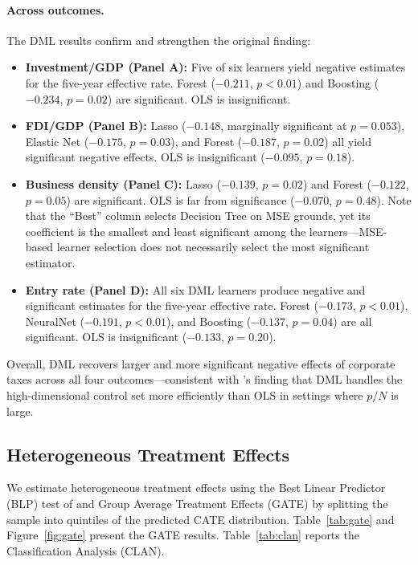 \documentclass[12pt]{article}
\begin{document}
\paragraph{Across outcomes.}
The DML results confirm and strengthen the original finding:
\begin{itemize}
  \item \textbf{Investment/GDP (Panel A):} Five of six learners yield negative estimates
        for the five-year effective rate. Forest ($-0.211$, $p < 0.01$) and Boosting
        ($-0.234$, $p = 0.02$) are significant. OLS is insignificant.
  \item \textbf{FDI/GDP (Panel B):} Lasso ($-0.148$, marginally significant at $p = 0.053$), Elastic Net
        ($-0.175$, $p = 0.03$), and Forest ($-0.187$, $p = 0.02$) all yield significant
        negative effects. OLS is insignificant ($-0.095$, $p = 0.18$).
  \item \textbf{Business density (Panel C):} Lasso ($-0.139$, $p = 0.02$) and Forest
        ($-0.122$, $p = 0.05$) are significant. OLS is far from significance
        ($-0.070$, $p = 0.48$). Note that the ``Best'' column selects Decision Tree
        on MSE grounds, yet its coefficient is the smallest and least significant
        among the learners---MSE-based learner selection does not necessarily select
        the most significant estimator.
  \item \textbf{Entry rate (Panel D):} All six DML learners produce negative and
        significant estimates for the five-year effective rate. Forest ($-0.173$,
        $p < 0.01$), NeuralNet ($-0.191$, $p < 0.01$), and Boosting ($-0.137$, $p = 0.04$)
        are all significant. OLS is insignificant ($-0.133$, $p = 0.20$).
\end{itemize}

Overall, DML recovers larger and more significant negative effects of corporate
taxes across all four outcomes---consistent with \citet{baiardi2024}'s finding that
DML handles the high-dimensional control set more efficiently than OLS in settings
where $p/N$ is large.

\subsection{Heterogeneous Treatment Effects}

We estimate heterogeneous treatment effects using the Best Linear Predictor (BLP)
test of \citet{chernozhukov2018} and Group Average Treatment Effects (GATE) by
splitting the sample into quintiles of the predicted CATE distribution.
Table~\ref{tab:gate} and Figure~\ref{fig:gate} present the GATE results.
Table~\ref{tab:clan} reports the Classification Analysis (CLAN).
\end{document}
